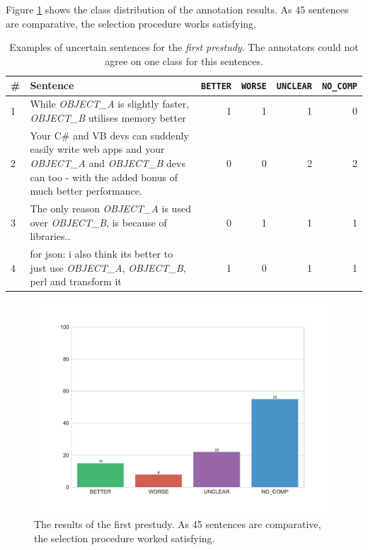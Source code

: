 Figure \ref{fig:dist_pre_a} shows the class distribution of the annotation results. As 45  sentences are comparative, the selection procedure works satisfying.


\begin{table}[htbp]
\centering
\caption{Examples of uncertain sentences for the \emph{first prestudy}. The annotators could not agree on one class for this sentences. }
\label{tbl:pre_1_res}
\begin{tabularx}{\textwidth}{lXrrrr}
\toprule
\# & Sentence        & \texttt{BETTER} & \texttt{WORSE} & \texttt{UNCLEAR} & \texttt{NO\_COMP}          \\ \midrule

1&While \emph{OBJECT\_A} is slightly faster, \emph{OBJECT\_B} utilises memory better & 1 & 1 & 1 & 0 \\

2&Your C\# and VB devs can suddenly easily write web apps and your \emph{OBJECT\_A} and \emph{OBJECT\_B} devs can too - with the added bonus of much better performance. & 0 & 0 & 2 & 2 \\

3&The only reason \emph{OBJECT\_A} is used over \emph{OBJECT\_B}, is because of libraries.. & 0 & 1 & 1 & 1 \\

4&for json: i also think its better to just use \emph{OBJECT\_A}, \emph{OBJECT\_B}, perl and transform it & 1 & 0 & 1 & 1 \\

\bottomrule                              
\end{tabularx}
\end{table}

\begin{figure}[htbp]
\centering
\caption{The results of the first prestudy. As 45  sentences are comparative, the selection procedure worked satisfying.}
\label{fig:dist_pre_a}
\includegraphics[width=1\linewidth]{images/dataset/prea-dist}
\end{figure}
\FloatBarrier

